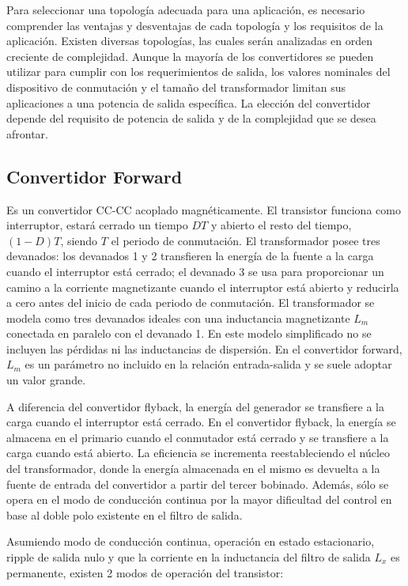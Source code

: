 Para seleccionar una topología adecuada para una aplicación, es necesario comprender las ventajas y desventajas de cada topología y los requisitos de la aplicación. 
Existen diversas topologías, las cuales serán analizadas en orden creciente de complejidad. 
Aunque la mayoría de los convertidores se pueden utilizar para cumplir con los requerimientos de salida, 
los valores nominales del dispositivo de conmutación y el tamaño del transformador limitan sus aplicaciones a una potencia de salida específica. 
La elección del convertidor depende del requisito de potencia de salida y de la complejidad que se desea afrontar.

\subsection{Convertidor Forward}

Es un convertidor CC-CC acoplado magnéticamente. El transistor funciona como interruptor, estará cerrado un tiempo $DT$ y abierto el resto del tiempo,
$(1 - D)T$, siendo $T$ el periodo de conmutación. 
El transformador posee tres devanados: los devanados 1 y 2 transfieren la energía de la
fuente a la carga cuando el interruptor está cerrado; el devanado 3 se usa para proporcionar un
camino a la corriente magnetizante cuando el interruptor está abierto y reducirla a cero antes del
inicio de cada periodo de conmutación. El transformador se modela como tres devanados ideales
con una inductancia magnetizante $L_m$ conectada en paralelo con el devanado 1. En este modelo simplificado no se incluyen las pérdidas ni las inductancias de dispersión.
En el convertidor forward, $L_m$ es un parámetro no incluido en la relación entrada-salida y se suele adoptar un valor grande.

A diferencia del convertidor flyback, la energía del generador se transfiere a la carga cuando el interruptor
está cerrado. En el convertidor flyback, la energía se almacena en el primario cuando el conmutador
está cerrado y se transfiere a la carga cuando está abierto. 
La eficiencia se incrementa reestableciendo el núcleo del transformador, 
donde la energía almacenada en el mismo es devuelta a la fuente de entrada del convertidor a partir del tercer bobinado. 
Además, sólo se opera en el modo de conducción continua por la mayor dificultad del control en base al doble polo existente en el filtro de salida. 

Asumiendo modo de conducción continua, operación en estado estacionario, ripple de salida nulo 
y que la corriente en la inductancia del filtro de salida $L_x$ es permanente, existen 2 modos de operación del transistor:

